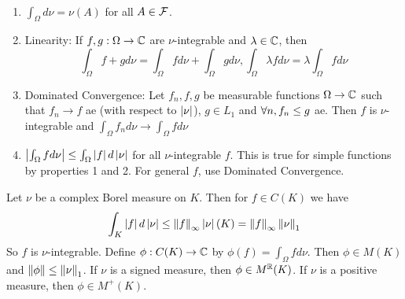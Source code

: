 \documentclass{article}
\begin{document}
\begin{prop}~
  \begin{enumerate}
    \item $\int_\Omega d\nu = \nu(A)$ for all $A \in \mathcal F$.
    \item Linearity: If $f, g : \Omega \to \mathbb C$ are $\nu$-integrable and $\lambda \in \mathbb C$, then
    $$\int_\Omega f + g d\nu = \int_\Omega fd\nu + \int_\Omega gd\nu, \int_\Omega \lambda fd\nu = \lambda \int_\Omega fd\nu$$
  \item Dominated Convergence: Let $f_n, f, g$ be measurable functions $\Omega \to \mathbb C$ such that $f_n \to f$ ae (with respect to $\left\lvert \nu\right\rvert$), $g \in L_1$ and $\forall n, f_n \le g$ ae. Then $f$ is $\nu$-integrable and $\int_\Omega f_n d\nu \to \int_\Omega f d\nu$
  \item $\left\lvert \int_\Omega f d\nu\right\rvert \le \int_\Omega \left\lvert f\right\rvert d\left\lvert \nu\right\rvert$ for all $\nu$-integrable $f$. This is true for simple functions by properties 1 and 2. For general $f$, use Dominated Convergence.
  \end{enumerate}
\end{prop}

Let $\nu$ be a complex Borel measure on $K$. Then for $f \in C(K)$ we have
$$\int_K \left\lvert f\right\rvert d\left\lvert \nu\right\rvert \le \left\lVert f\right\rVert_\infty \left\lvert \nu\right\rvert(K) = \left\lVert f\right\rVert_\infty \left\lVert \nu\right\rVert_1$$
So $f$ is $\nu$-integrable. Define $\phi : C(K) \to \mathbb C$ by $\phi(f) = \int_\Omega f d\nu$. Then $\phi \in M(K)$ and $\left\lVert \phi\right\rVert \le \left\lVert \nu\right\rVert_1$. If $\nu$ is a signed measure, then $\phi \in M^\mathbb R(K)$. If $\nu$ is a positive measure, then $\phi \in M^+(K)$.
\end{document}
